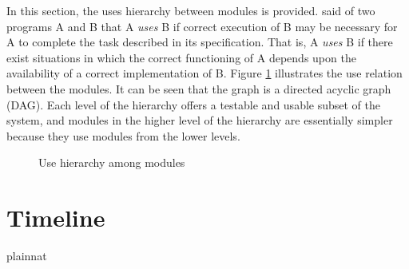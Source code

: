 \documentclass[12pt, titlepage]{article}
\begin{document}
In this section, the uses hierarchy between modules is
provided. \citet{Parnas1978} said of two programs A and B that A {\em uses} B if
correct execution of B may be necessary for A to complete the task described in
its specification. That is, A {\em uses} B if there exist situations in which
the correct functioning of A depends upon the availability of a correct
implementation of B.  Figure \ref{FigUH} illustrates the use relation between
the modules. It can be seen that the graph is a directed acyclic graph
(DAG). Each level of the hierarchy offers a testable and usable subset of the
system, and modules in the higher level of the hierarchy are essentially simpler
because they use modules from the lower levels.

\begin{figure}[H]
\centering
\caption{Use hierarchy among modules}
\label{FigUH}
\end{figure}

\section{Timeline}


 {plainnat}


\newpage{}
\end{document}

